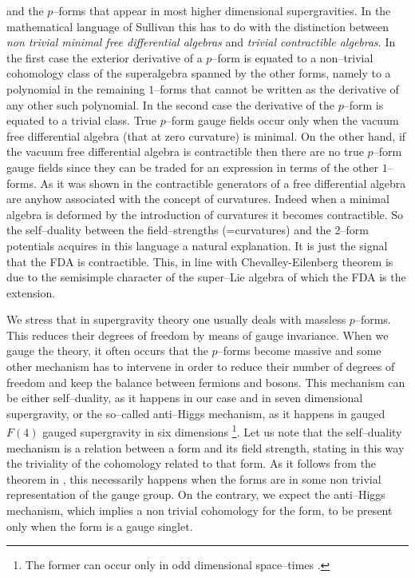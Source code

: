 \documentclass[a4paper,12pt]{article}
\begin{document}
and the $p$--forms that appear in most higher dimensional
supergravities. In the mathematical language of Sullivan
\cite{sull} this  has to do with the distinction between {\it non
trivial minimal free differential algebras} and {\it trivial
contractible algebras}. In the first case the exterior derivative
of a $p$--form is equated to a non--trivial cohomology class of
the superalgebra spanned by the other forms, namely to a
polynomial in the remaining  $1$--forms that cannot be written as
the derivative of any other such polynomial. In the second case
the derivative of the $p$--form is equated to a trivial class.
True $p$--form gauge fields occur only when  the vacuum free
differential algebra (that at zero curvature) is minimal. On the
other hand, if the vacuum free differential algebra is
contractible then there are no true $p$--form gauge fields since
they can be traded for an expression in terms of the other
$1$--forms. As it was shown in \cite{Fre:1984pc} the contractible
generators of a free differential algebra are anyhow associated
with the concept of curvatures. Indeed when a minimal algebra is
deformed by the introduction of curvatures it becomes
contractible. So the self--duality between the field--strengths
(=curvatures) and the 2--form potentials acquires in this language
a natural explanation. It is just the signal that the FDA is
contractible. This, in line with Chevalley-Eilenberg theorem is
due to the semisimple character of the super--Lie algebra of which
the FDA is the extension.
\par
We  stress that in  supergravity theory one usually deals  with
massless $p$--forms. This reduces their degrees of freedom by
means of gauge invariance. When we gauge the theory, it often
occurs that the $p$--forms become massive and some other mechanism
has to intervene in order to reduce their number of degrees of
freedom and keep the balance between fermions and bosons. This
mechanism can be either self--duality, as it happens in our case
and in seven dimensional supergravity, or the so--called
anti--Higgs mechanism, as it happens in gauged $F(4)$ gauged
supergravity in six dimensions \cite{F4} \footnote{The former can
occur only in odd dimensional space--times \cite{townsend}.}. Let
us note that the self--duality mechanism is a relation  between a
form and its field strength, stating in this way the triviality of
the cohomology related to that form. As it follows from the
theorem  in \cite{sull}, this necessarily happens when the forms
are in some non trivial representation of the gauge group. On the
contrary, we expect the anti--Higgs mechanism, which implies a non
trivial cohomology for the form, to be present only when the form
is a gauge singlet.
\end{document}
